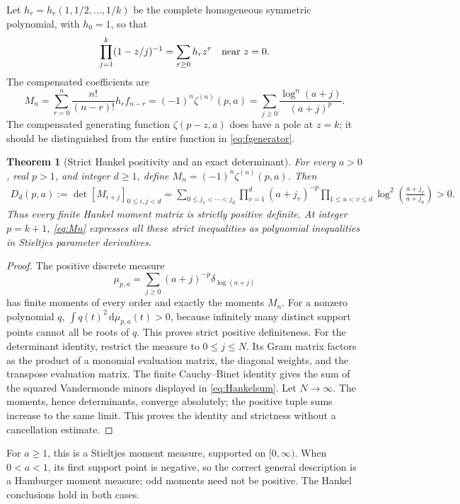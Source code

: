 \documentclass[11pt]{article}
\numberwithin{equation}{section}
\newtheorem{theorem}{Theorem}[section]
\theoremstyle{definition}\newtheorem{definition}[theorem]{Definition}
\theoremstyle{remark}\newtheorem{remark}[theorem]{Remark}
\newcommand{\dd}{\,\mathrm d}
\begin{document}
Let $h_r=h_r(1,1/2,\ldots,1/k)$ be the complete homogeneous symmetric
polynomial, with $h_0=1$, so that
\[
 \prod_{j=1}^k(1-z/j)^{-1}=\sum_{r\ge0}h_r z^r
 \quad\hbox{near }z=0.
\]
The compensated coefficients are
\begin{equation}\label{eq:Mn}
 M_n=\sum_{r=0}^n\frac{n!}{(n-r)!}h_r f_{n-r}
       =(-1)^n\zeta^{(n)}(p,a)
       =\sum_{j\ge0}\frac{\log^n(a+j)}{(a+j)^p}.
\end{equation}
The compensated generating function $\zeta(p-z,a)$ does have a pole
at $z=k$; it should be distinguished from the entire function in
\eqref{eq:fgenerator}.

\begin{theorem}[Strict Hankel positivity and an exact determinant]
\label{thm:hankel}
For every $a>0$, real $p>1$, and integer $d\ge1$, define
$M_n=(-1)^n\zeta^{(n)}(p,a)$. Then
\begin{align}\label{eq:Hankelsum}
 D_d(p,a):=\det[M_{i+j}]_{0\le i,j<d}
 =\sum_{0\le j_1<\cdots<j_d}
 \prod_{v=1}^d(a+j_v)^{-p}
 \prod_{1\le u<v\le d}
        \log^2\left(\frac{a+j_v}{a+j_u}\right)>0.
\end{align}
Thus every finite Hankel moment matrix is strictly positive definite.
At integer $p=k+1$, \eqref{eq:Mn} expresses all these strict
inequalities as polynomial inequalities in Stieltjes parameter
derivatives.
\end{theorem}
\begin{proof}
The positive discrete measure
\[
 \mu_{p,a}=\sum_{j\ge0}(a+j)^{-p}\delta_{\log(a+j)}
\]
has finite moments of every order and exactly the moments $M_n$.
For a nonzero polynomial $q$,
$\int q(t)^2\dd\mu_{p,a}(t)>0$, because infinitely many distinct
support points cannot all be roots of $q$. This proves strict positive
definiteness. For the determinant identity, restrict the measure to
$0\le j\le N$. Its Gram matrix factors as the product of a monomial
evaluation matrix, the diagonal weights, and the transpose evaluation
matrix. The finite Cauchy--Binet identity gives the sum of the squared
Vandermonde minors displayed in \eqref{eq:Hankelsum}. Let $N\to\infty$.
The moments, hence determinants, converge absolutely; the positive
tuple sums increase to the same limit. This proves the identity and
strictness without a cancellation estimate.
\end{proof}

For $a\ge1$, this is a Stieltjes moment measure, supported on
$[0,\infty)$. When $0<a<1$, its first support point is negative, so
the correct general description is a Hamburger moment measure; odd
moments need not be positive. The Hankel conclusions hold in both cases.
\end{document}
